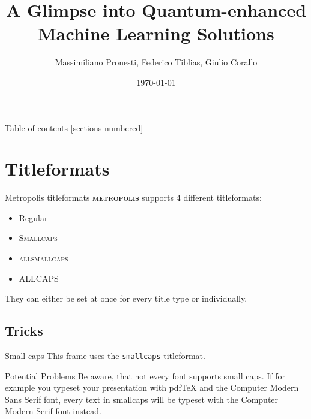 \documentclass[10pt]{beamer}
\title{A Glimpse into Quantum-enhanced Machine Learning Solutions}
\date{\today}
\author{
	Massimiliano Pronesti, 
	Federico Tiblias, 
	Giulio Corallo
}
\institute{Amadeus Knowledge Sharing Session}
\newcommand{\themename}{\textbf{\textsc{metropolis}}\xspace}
\begin{document}
	
	\maketitle
	
	\begin{frame}{Table of contents}
		[sections numbered]
		\tableofcontents
	\end{frame}
	
	
	
	
	\section{Titleformats}
	
	\begin{frame}{Metropolis titleformats}
		\themename supports 4 different titleformats:
		\begin{itemize}
			\item Regular
			\item \textsc{Smallcaps}
			\item \textsc{allsmallcaps}
			\item ALLCAPS
		\end{itemize}
		They can either be set at once for every title type or individually.
	\end{frame}
	
	\subsection{Tricks}
	
	{
		\begin{frame}{Small caps}
			This frame uses the \texttt{smallcaps} titleformat.
			
			\begin{alertblock}{Potential Problems}
				Be aware, that not every font supports small caps. If for example you typeset your presentation with pdfTeX and the Computer Modern Sans Serif font, every text in smallcaps will be typeset with the Computer Modern Serif font instead.
			\end{alertblock}
		\end{frame}
	}
	
\end{document}
